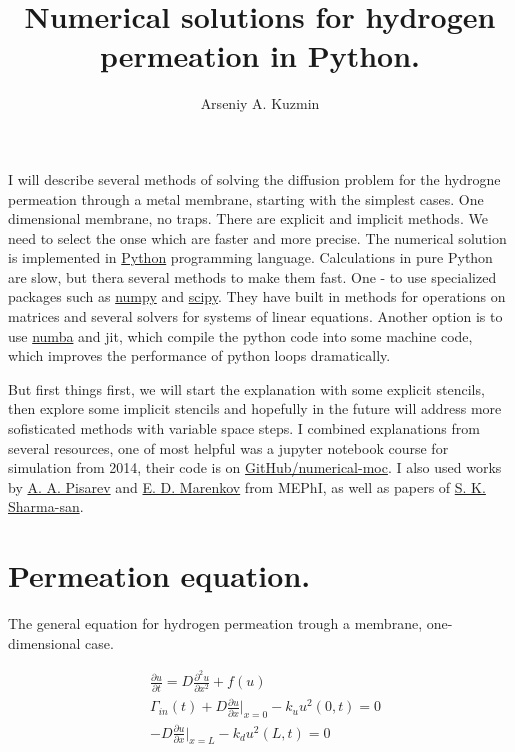 \documentclass[12pt]{article}
\title{Numerical solutions for hydrogen permeation in Python.}
\author{Arseniy A. Kuzmin}
\begin{document}
\maketitle

I will describe several methods of solving the diffusion problem for the hydrogne permeation through a metal membrane, starting with the simplest cases. One dimensional membrane, no traps. There are explicit and implicit methods. We need to select the onse which are faster and more precise. The numerical solution is implemented in \href{https://www.python.org/}{Python} programming language. Calculations in pure Python are slow, but thera several methods to make them fast. One - to use specialized packages such as \href{https://numpy.org/}{numpy} and \href{https://www.scipy.org/}{scipy}. They have built in methods for operations on matrices and several solvers for systems of linear equations. Another option is to use \href{https://numba.pydata.org/}{numba} and jit, which compile the python code into some machine code, which improves the performance of python loops dramatically.

But first things first, we will start the explanation with some explicit stencils, then explore some implicit stencils and hopefully in the future will address more sofisticated methods with variable space steps. I combined explanations from several resources, one of most helpful was a jupyter notebook course for simulation from 2014, their code is on \href{https://github.com/numerical-mooc/numerical-mooc}{GitHub/numerical-moc}. I also used works by \href{https://www.researchgate.net/profile/A_Pisarev}{A. A. Pisarev} and \href{https://www.researchgate.net/profile/E_Marenkov}{E. D. Marenkov} from MEPhI, as well as papers of \href{https://www.researchgate.net/profile/SK_Sharma2}{S. K. Sharma-san}.

\section{Permeation equation.}
The general equation for hydrogen permeation trough a membrane, one-dimensional case.

\begin{align}
        &\frac{\partial u}{\partial t} = D \frac{\partial^2 u}{\partial x^2} + f(u) \label{eq:diff}\\
        &\Gamma_{in}(t) + D\frac{\partial u}{\partial x}\big|_{x = 0} - k_{u}u^{2}(0,t) = 0\\
        &-D\frac{\partial u}{\partial x}\big|_{x =L} - k_{d}u^{2}(L,t) = 0
\end{align}
\end{document}
